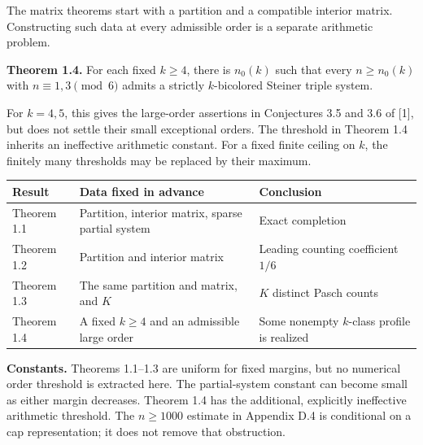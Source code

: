 \documentclass[english,11pt,a4paper]{article}
\newcounter{none}
\begin{document}
The matrix theorems start with a partition and a compatible interior matrix. Constructing such data at every admissible order is a separate arithmetic problem.

\textbf{Theorem 1.4.} For each fixed \(k\ge4\), there is \(n_0(k)\) such that every \(n\ge n_0(k)\) with \(n\equiv1,3\pmod6\) admits a strictly \(k\)-bicolored Steiner triple system.

For \(k=4,5\), this gives the large-order assertions in Conjectures 3.5 and 3.6 of {[}1{]}, but does not settle their small exceptional orders. The threshold in Theorem 1.4 inherits an ineffective arithmetic constant. For a fixed finite ceiling on \(k\), the finitely many thresholds may be replaced by their maximum.

{\begin{longtable}[]{@{}
  >{\raggedright\arraybackslash}p{}
  >{\raggedright\arraybackslash}p{}
  >{\raggedright\arraybackslash}p{}@{}}
\toprule\noalign{}
\begin{minipage}[b]{\linewidth}\raggedright
Result
\end{minipage} & \begin{minipage}[b]{\linewidth}\raggedright
Data fixed in advance
\end{minipage} & \begin{minipage}[b]{\linewidth}\raggedright
Conclusion
\end{minipage} \\
\midrule\noalign{}
\endhead
\bottomrule\noalign{}
\endlastfoot
Theorem 1.1 & Partition, interior matrix, sparse partial system & Exact completion \\
Theorem 1.2 & Partition and interior matrix & Leading counting coefficient \(1/6\) \\
Theorem 1.3 & The same partition and matrix, and \(K\) & \(K\) distinct Pasch counts \\
Theorem 1.4 & A fixed \(k\ge4\) and an admissible large order & Some nonempty \(k\)-class profile is realized \\
\end{longtable}
}

\textbf{Constants.} Theorems 1.1--1.3 are uniform for fixed margins, but no numerical order threshold is extracted here. The partial-system constant can become small as either margin decreases. Theorem 1.4 has the additional, explicitly ineffective arithmetic threshold. The \(n\ge1000\) estimate in Appendix D.4 is conditional on a cap representation; it does not remove that obstruction.
\end{document}
